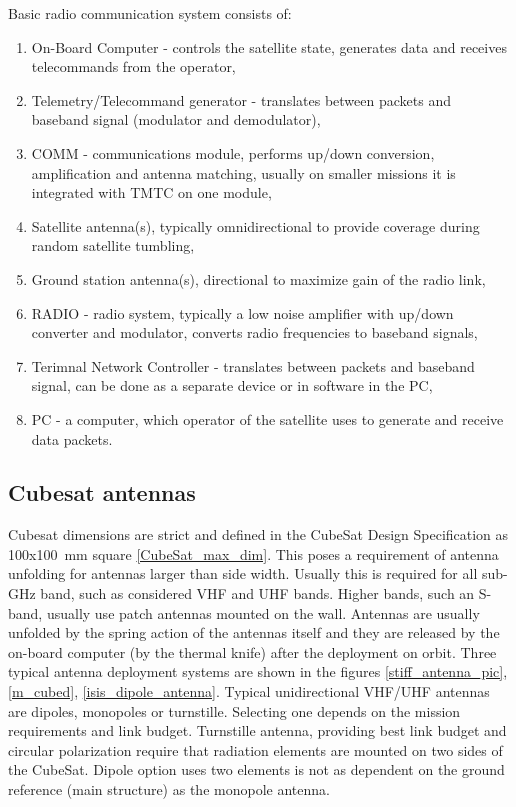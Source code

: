 Basic radio communication system consists of:
\begin{enumerate}
    \item On-Board Computer - controls the satellite state, generates data and receives telecommands from the operator,
    \item Telemetry/Telecommand generator - translates between packets and baseband signal (modulator and demodulator),
    \item COMM - communications module, performs up/down conversion, amplification and antenna matching, usually on smaller missions it is integrated with TMTC on one module,
    \item Satellite antenna(s), typically omnidirectional to provide coverage during random satellite tumbling,
    \item Ground station antenna(s), directional to maximize gain of the radio link,
    \item RADIO - radio system, typically a low noise amplifier with up/down converter and modulator, converts radio frequencies to baseband signals,
    \item Terimnal Network Controller - translates between packets and baseband signal, can be done as a separate device or in software in the PC,
    \item PC - a computer, which operator of the satellite uses to generate and receive data packets.
\end{enumerate}

\subsection{Cubesat antennas}
Cubesat dimensions are strict and defined in the CubeSat Design Specification \cite{cubesat_spec} as \si{100}x\si{100}~mm square \ref{CubeSat_max_dim}. This poses a requirement of antenna unfolding for antennas larger than side width. Usually this is required for all sub-GHz band, such as considered VHF and UHF bands. Higher bands, such an S-band, usually use patch antennas mounted on the wall. 
Antennas are usually unfolded by the spring action of the antennas itself and they are released by the on-board computer (by the thermal knife) after the deployment on orbit. Three typical antenna deployment systems are shown in the figures \ref{stiff_antenna_pic}, \ref{m_cubed}, \ref{isis_dipole_antenna}.
Typical unidirectional VHF/UHF antennas are dipoles, monopoles or turnstille. Selecting one depends on the mission requirements and link budget. Turnstille antenna, providing best link budget and circular polarization require that radiation elements are mounted on two sides of the CubeSat. Dipole option uses two elements is not as dependent on the ground reference (main structure) as the monopole antenna.

